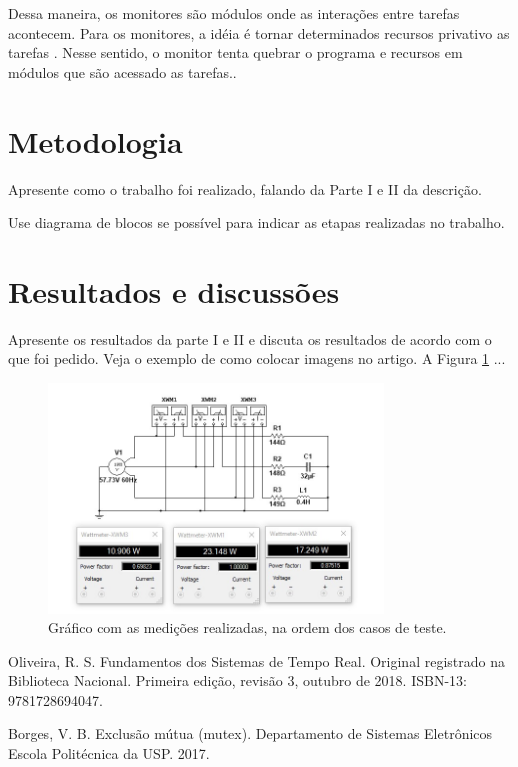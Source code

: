 \documentclass[journal]{IEEEtran}
\begin{document}
Dessa maneira, os monitores são módulos onde as interações entre tarefas acontecem. Para os monitores, a idéia é tornar determinados recursos privativo as tarefas \cite{IEEEhowto:romulo}. Nesse sentido, o monitor tenta quebrar o programa e recursos em módulos que são acessado as tarefas.. 

\section{Metodologia}

Apresente como o trabalho foi realizado, falando da Parte I e II da descrição. 

Use diagrama de blocos se possível para indicar as etapas realizadas no trabalho.

\section{Resultados e discussões}

Apresente os resultados da parte I e II e discuta os resultados de acordo com o que foi pedido. Veja o exemplo de como colocar imagens no artigo. A Figura \ref{fig1} ...

	\begin{figure}[h]
	\centering
	\includegraphics[width=3.5in]{Imagens/medidas.jpg}	
	\caption{Gráfico com as medições realizadas, na ordem dos casos de teste.}
	\label{fig1}
\end{figure}


\ifCLASSOPTIONcaptionsoff
  \newpage
\fi

\begin{thebibliography}{1}

Oliveira, R. S. Fundamentos dos Sistemas de Tempo Real. Original registrado na Biblioteca Nacional. Primeira edição, revisão 3, outubro de 2018. ISBN-13: 9781728694047.

Borges, V. B. Exclusão mútua (mutex). Departamento de Sistemas Eletrônicos Escola Politécnica da USP. 2017.

\end{thebibliography}

\end{document}

